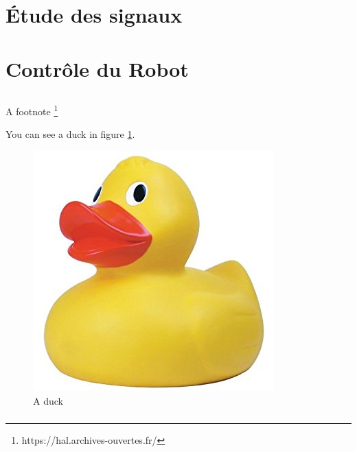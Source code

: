 \documentclass[11pt]{article}
\begin{document}

\section{Étude des signaux}




\cleardoublepage


\section{Contrôle du Robot}

 	  
\subsection{}
A footnote \footnote{https://hal.archives-ouvertes.fr/}

You can see a duck in figure \ref{fig:duck}.

\begin{figure}[!h]
\centering
\includegraphics[scale=0.3]{bidon.jpg}
\caption{A duck}
\label{fig:duck}
\end{figure}


\subsubsection{} \label{Deep}

	
\subsubsection{}
\end{document}
